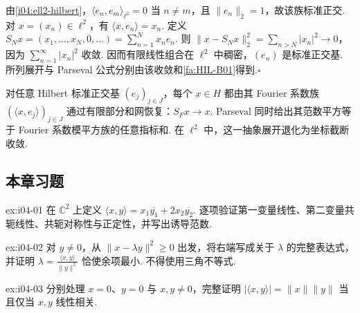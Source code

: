 \begin{FAProof}
由\autoref{i04:ell2-hilbert}，\(\displaystyle \langle e_n,e_m\rangle_{\ell^2}=0\) 当 \(\displaystyle n\neq m\)，且 \(\displaystyle \|e_n\|_2=1\)，故该族标准正交. 对 \(\displaystyle x=(x_n)\in\ell^2\)，有 \(\displaystyle \langle x,e_n\rangle=x_n\). 定义 \(\displaystyle S_Nx=(x_1,\dots,x_N,0,\dots) =\sum_{n=1}^{N}x_ne_n\).
则 \(\displaystyle \|x-S_Nx\|_2^2 =\sum_{n>N}|x_n|^2\to0\)，
因为 \(\displaystyle \sum_{n=1}^{\infty}|x_n|^2\) 收敛. 因而有限线性组合在 \(\displaystyle \ell^2\) 中稠密，\(\displaystyle (e_n)\) 是标准正交基. 所列展开与 Parseval 公式分别由该收敛和\autoref{fa:HIL-B01}得到.\hfill\(\square\)

\end{FAProof}

\begin{FAApplication}[抽象正交展开]
对任意 Hilbert 标准正交基 \(\displaystyle (e_j)_{j\in J}\)，每个 \(\displaystyle x\in H\) 都由其 Fourier 系数族 \(\displaystyle (\langle x,e_j\rangle)_{j\in J}\) 通过有限部分和网恢复：\(\displaystyle S_Fx\to x\). Parseval 同时给出其范数平方等于 Fourier 系数模平方族的任意指标和. 在 \(\displaystyle \ell^2\) 中，这一抽象展开退化为坐标截断收敛.
\end{FAApplication}

\subsection{本章习题}\label{sec:i04-exercises}

\begin{FAExercise}[内积公理与复共轭位置]{ex:i04-01}
在 \(\displaystyle \mathbb C^2\) 上定义 \(\displaystyle \langle x,y\rangle=x_1\overline{y_1}+2x_2\overline{y_2}\). 逐项验证第一变量线性、第二变量共轭线性、共轭对称性与正定性，并写出诱导范数.
\end{FAExercise}

\begin{FAExercise}{ex:i04-02}
对 \(\displaystyle y\neq0\)，从 \(\displaystyle \|x-\lambda y\|^2\geqslant0\) 出发，将右端写成关于 \(\displaystyle \lambda\) 的完整表达式，并证明 \(\displaystyle \lambda=\frac{\langle x,y\rangle}{\|y\|^2}\) 恰使余项最小. 不得使用三角不等式.
\end{FAExercise}

\begin{FAExercise}{ex:i04-03}
分别处理 \(\displaystyle x=0\)、\(\displaystyle y=0\) 与 \(\displaystyle x,y\neq0\)，完整证明 \(\displaystyle |\langle x,y\rangle|=\|x\|\|y\|\) 当且仅当 \(\displaystyle x,y\) 线性相关.
\end{FAExercise}


